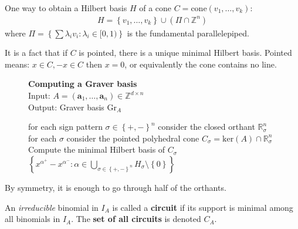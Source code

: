 \documentclass[a4paper, 11pt]{article}
\begin{document}
\begin{remark}
  One way to obtain a Hilbert basis \( H \) of a cone \( C = \mathrm{cone}(v_1, \dots, v_k) \):
  \begin{align*}
    H = \left\{ v_1, \dots, v_k \right\} \cup (\Pi \cap \mathbb Z^n)
  \end{align*}
  where \( \Pi = \left\{ \sum \lambda_i v_i: \lambda_i \in [0,1) \right\} \) is the fundamental parallelepiped.
\end{remark}

\begin{remark}
  It is a fact that if \( C \) is pointed, there is a unique minimal Hilbert basis. Pointed means: \( x \in C, -x \in C \) then \( x = 0 \), or equivalently the cone contains no line.
\end{remark}

\begin{figure}[H]
  \begin{mdframed}
    \textbf{Computing a Graver basis}\\
    Input: \( A = (\mathbf a_1, \dots , \mathbf a_n) \in \mathbb Z^{d \times n}\)\\
    Output: Graver basis \( \mathrm{Gr}_A \)
  
    \begin{algorithmic}[1]
      \State for each sign pattern \( \sigma \in \left\{ +,- \right\}^n \) consider the closed orthant \( \mathbb R^n_\sigma \)
      \State for each \( \sigma \) consider the pointed polyhedral cone \( C_\sigma = \mathrm{ker}(A) \cap \mathbb R^n_\sigma \)
      \State Compute the minimal Hilbert basis of \( C_\sigma \)
      \State \Return \( \left\{ x^{\alpha^+} - x^{\alpha^-} : \alpha \in \bigcup_{\sigma \in \left\{ +,- \right\}^n} H_\sigma \setminus \left\{ 0 \right\} \right\}  \)
    \end{algorithmic}
  \end{mdframed}
\end{figure}

\begin{remark}
  By symmetry, it is enough to go through half of the orthants.
\end{remark}

\begin{defi}[Circuit]
  An \emph{irreducible} binomial in \( I_A \) is called a \textbf{circuit} if its support is minimal among all binomials in \( I_A \). The \textbf{set of all circuits} is denoted \( C_A \).
\end{defi}
\end{document}

